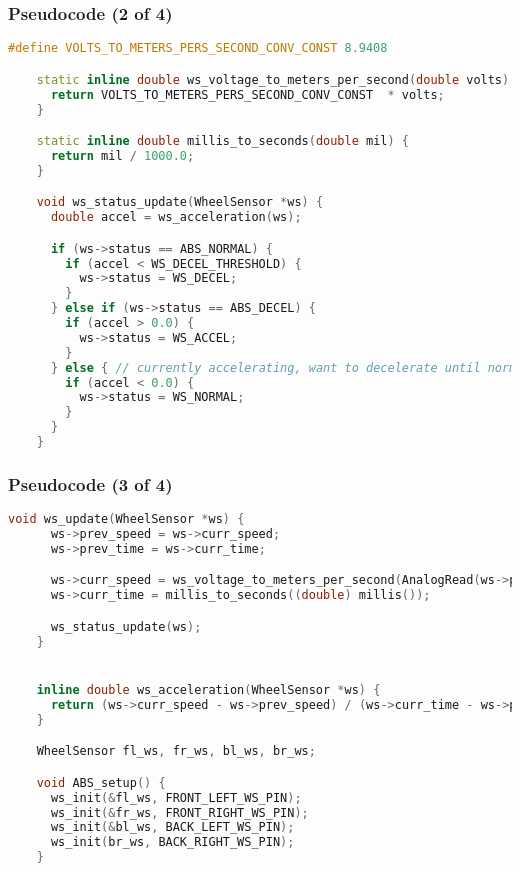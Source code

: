 \documentclass{beamer}
\begin{document}
\begin{frame}[fragile]
  \frametitle{Pseudocode (2 of 4)}
  \begin{lstlisting}[language=c++, basicstyle=\tiny, columns=fullflexible]
    #define VOLTS_TO_METERS_PERS_SECOND_CONV_CONST 8.9408

    static inline double ws_voltage_to_meters_per_second(double volts) {
      return VOLTS_TO_METERS_PERS_SECOND_CONV_CONST  * volts;
    }

    static inline double millis_to_seconds(double mil) {
      return mil / 1000.0;
    }

    void ws_status_update(WheelSensor *ws) {
      double accel = ws_acceleration(ws);

      if (ws->status == ABS_NORMAL) {
        if (accel < WS_DECEL_THRESHOLD) {
          ws->status = WS_DECEL;
        }
      } else if (ws->status == ABS_DECEL) {
        if (accel > 0.0) {
          ws->status = WS_ACCEL;
        }
      } else { // currently accelerating, want to decelerate until normal
        if (accel < 0.0) {
          ws->status = WS_NORMAL;
        }
      }
    }

  \end{lstlisting}
\end{frame}

\begin{frame}[fragile]
  \frametitle{Pseudocode (3 of 4)}
  \begin{lstlisting}[language=c++, basicstyle=\tiny, columns=fullflexible]
    void ws_update(WheelSensor *ws) {
      ws->prev_speed = ws->curr_speed;
      ws->prev_time = ws->curr_time;

      ws->curr_speed = ws_voltage_to_meters_per_second(AnalogRead(ws->pin));
      ws->curr_time = millis_to_seconds((double) millis());

      ws_status_update(ws);
    }


    inline double ws_acceleration(WheelSensor *ws) {
      return (ws->curr_speed - ws->prev_speed) / (ws->curr_time - ws->prev_time);
    }

    WheelSensor fl_ws, fr_ws, bl_ws, br_ws;

    void ABS_setup() {
      ws_init(&fl_ws, FRONT_LEFT_WS_PIN);
      ws_init(&fr_ws, FRONT_RIGHT_WS_PIN);
      ws_init(&bl_ws, BACK_LEFT_WS_PIN);
      ws_init(br_ws, BACK_RIGHT_WS_PIN);
    }

\end{lstlisting}
\end{frame}
\end{document}

